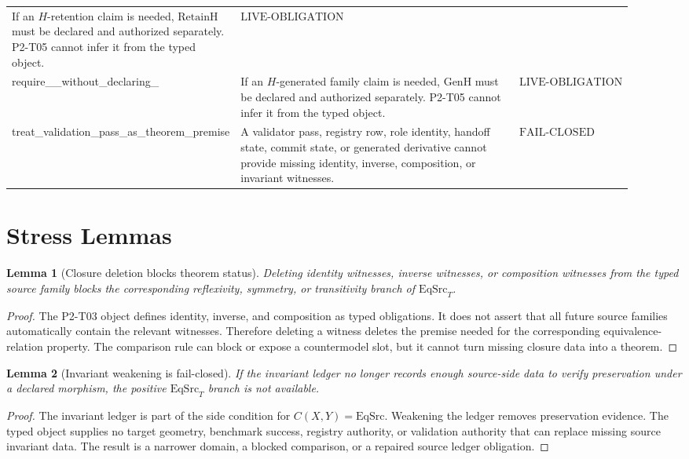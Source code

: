 \documentclass[11pt]{article}
\newcommand{\EqSrc}{\mathrm{EqSrc}}
\newcommand{\EqSrcT}{\mathrm{EqSrc}_{T}}
\newcommand{\RetainH}{\mathrm{RetainH}}
\newcommand{\GenH}{\mathrm{GenH}}
\newcommand{\Csrc}{C}
\newcommand{\FailClosed}{\mathrm{FAIL}\mbox{-}\mathrm{CLOSED}}
\newcommand{\LiveObligation}{\mathrm{LIVE}\mbox{-}\mathrm{OBLIGATION}}
\newtheorem{lemma}{Lemma}
\begin{document}
\begin{longtable}{p{0.30\linewidth}p{0.48\linewidth}p{0.14\linewidth}}
If an \(H\)-retention claim is needed, \(\RetainH\) must be declared and
authorized separately. P2-T05 cannot infer it from the typed object. &
\(\LiveObligation\) \\
require\_\GenH\_without\_declaring\_\GenH &
If an \(H\)-generated family claim is needed, \(\GenH\) must be declared and
authorized separately. P2-T05 cannot infer it from the typed object. &
\(\LiveObligation\) \\
treat\_validation\_pass\_as\_theorem\_premise &
A validator pass, registry row, role identity, handoff state, commit state, or
generated derivative cannot provide missing identity, inverse, composition,
or invariant witnesses. & \(\FailClosed\) \\
\bottomrule
\end{longtable}

\section{Stress Lemmas}

\begin{lemma}[Closure deletion blocks theorem status]
Deleting identity witnesses, inverse witnesses, or composition witnesses from
the typed source family blocks the corresponding reflexivity, symmetry, or
transitivity branch of \(\EqSrcT\).
\end{lemma}

\begin{proof}
The P2-T03 object defines identity, inverse, and composition as typed
obligations. It does not assert that all future source families automatically
contain the relevant witnesses. Therefore deleting a witness deletes the
premise needed for the corresponding equivalence-relation property. The
comparison rule can block or expose a countermodel slot, but it cannot turn
missing closure data into a theorem.
\end{proof}

\begin{lemma}[Invariant weakening is fail-closed]
If the invariant ledger no longer records enough source-side data to verify
preservation under a declared morphism, the positive \(\EqSrcT\) branch is not
available.
\end{lemma}

\begin{proof}
The invariant ledger is part of the side condition for \(\Csrc(X,Y)=\EqSrc\).
Weakening the ledger removes preservation evidence. The typed object supplies
no target geometry, benchmark success, registry authority, or validation
authority that can replace missing source invariant data. The result is a
narrower domain, a blocked comparison, or a repaired source ledger obligation.
\end{proof}
\end{document}
